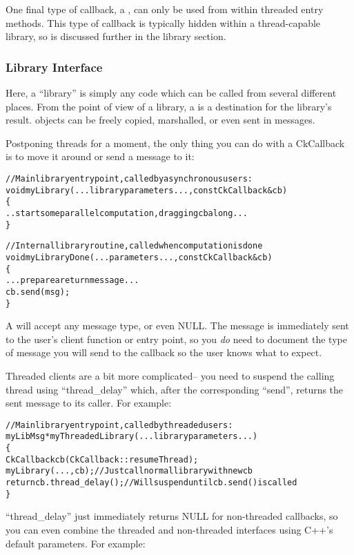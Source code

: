 One final type of callback, a , 
can only be used from within threaded entry methods.  This type of callback
is typically hidden within a thread-capable library, so is discussed further
in the library section.


\subsubsection{Library Interface}

Here, a ``library'' is simply any code which can be called from several
different places.  From the point of view of a library, a 
is a destination for the library's result.   objects can
be freely copied, marshalled, or even sent in messages.

Postponing threads for a moment, the only thing you can do 
with a CkCallback is to move it around or send a message to it:

\begin{alltt}
//Main library entry point, called by asynchronous users:
void myLibrary(...library parameters...,const CkCallback \&cb) 
\{
  ..start some parallel computation, dragging cb along...
\}

//Internal library routine, called when computation is done
void myLibraryDone(...parameters...,const CkCallback \&cb)
\{
  ...prepare a return message...
  cb.send(msg);
\}
\end{alltt}

A  will accept any message type, or even NULL.  The
message is immediately sent to the user's client function or entry point,
so you {\em do} need to document the type of message you will send to the 
callback so the user knows what to expect.

Threaded clients are a bit more complicated-- you need to suspend the
calling thread using ``thread\_delay'' which, after the corresponding
``send'', returns the sent message to its caller.  For example:

\begin{alltt}
//Main library entry point, called by threaded users:
myLibMsg *myThreadedLibrary(...library parameters...) 
\{
  CkCallback cb(CkCallback::resumeThread);
  myLibrary(...,cb); //Just call normal library with new cb
  return cb.thread\_delay(); //Will suspend until cb.send() is called
\}
\end{alltt}

``thread\_delay'' just immediately returns NULL for non-threaded callbacks,
so you can even combine the threaded and non-threaded interfaces
using C++'s default parameters.  For example:

